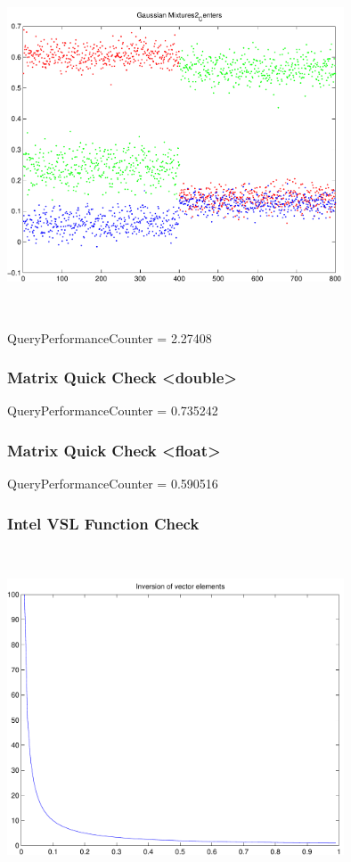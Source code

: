 \documentclass[9pt]{article}
\theoremstyle{plain}
\theoremstyle{definition}
\theoremstyle{remark}
\numberwithin{equation}{section}
\begin{document}
\includegraphics[width=10.0cm,height=10.0cm]{GaussianMixture_Dim_1_Centers2.pdf}

QueryPerformanceCounter  =  2.27408
\subsubsection{Matrix Quick Check <double>}
QueryPerformanceCounter  =  0.735242
\subsubsection{Matrix Quick Check <float>}
QueryPerformanceCounter  =  0.590516
\subsubsection{Intel VSL Function Check}
\includegraphics[width=10.0cm,height=10.0cm]{klVSLInv.pdf}
\end{document}
